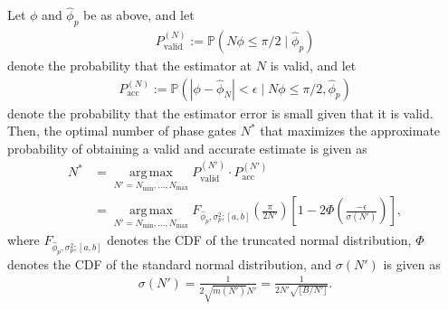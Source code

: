 \begin{theorem}\label{thm:stat-safeguard}
    Let $\phi$ and $\hat\phi_p$ be as above, and
    let 
    \begin{align}
        P_\text{valid}^{(N)} := \mathbb{P}(N \phi \leq\pi/2 \mid \hat\phi_p)
    \end{align}
    denote the probability that the estimator at $N$ is valid, and let
    \begin{align}
        P_\text{acc}^{(N)} := \mathbb{P}(|\phi - \hat\phi_N | < \epsilon \mid N\phi \leq \pi/2,\hat\phi_p)
    \end{align}
    denote the probability that the estimator error is small given that it is valid.
    Then, the optimal number of phase gates $N^*$ that maximizes the approximate probability of obtaining
    a valid and accurate estimate is given as
    \begin{align}
        N^* & = \underset{N'=N_\text{min},\ldots,N_\text{max}}{\operatorname{arg\,max}} P_\text{valid}^{(N')} \cdot P_\text{acc}^{(N')}                                                                                 \\
            & = \underset{N'=N_\text{min},\ldots,N_\text{max}}{\operatorname{arg\,max}} F_{\hat\phi_p, \sigma_p^2; [a, b]}\left(\frac{\pi}{2N'}\right) \left[1 - 2\Phi\left(\frac{-\epsilon}{\sigma(N')}\right)\right],
    \end{align}
    where $F_{\hat\phi_p, \sigma_p^2; [a, b]}$ denotes the CDF of the truncated normal distribution, $\Phi$ denotes the CDF of the standard normal distribution,
    and $\sigma(N')$ is given as
    \begin{align}
        \sigma(N') = \frac{1}{2 \sqrt{m(N')} N'} = \frac{1}{2 N'\sqrt{\lfloor B / N'\rfloor}}.
    \end{align}
\end{theorem}
